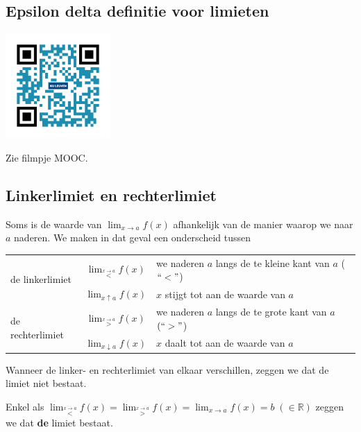 \subsection{Epsilon delta definitie voor limieten}
\begin{minipage}{.25\linewidth}
	\raggedright
	\includegraphics[width=4cm]{2_elem_rekenvaardigheden_B/inputs/QR_Code_EPSILONDELTA_module2}
\end{minipage}
\begin{minipage}{.7\linewidth}
	Zie filmpje MOOC.
\end{minipage}

\subsection{Linkerlimiet en rechterlimiet}

Soms is de waarde van $\lim_{x\to a}f(x)$ afhankelijk
van de manier waarop we naar $a$ naderen. We maken in dat geval een
onderscheid tussen

\begin{table}[h]
\centering
\begin{tabular}{lcl}
	\multirow{2}{*}{de linkerlimiet} & $\lim_{\overset{x\rightarrow a}{<}}f(x)$ & we naderen $a$ langs de te kleine kant van $a$ ($\lyxmathsym{\textquotedblleft}<\lyxmathsym{\textquotedblright}$)\\
	& $\lim_{x\uparrow a}f(x)$ & $x$ stijgt tot aan de waarde van $a$\\
	\multirow{2}{*}{de rechterlimiet} & $\lim_{\overset{x\rightarrow a}{>}}f(x)$ & we naderen $a$ langs de te grote kant van $a$ $(\lyxmathsym{\textquotedblleft}>\lyxmathsym{\textquotedblright}$)\\
	& $\lim_{x\downarrow a}f(x)$ & $x$ daalt tot aan de waarde van $a$\\
\end{tabular}
\end{table}

Wanneer de linker- en rechterlimiet van elkaar verschillen,
zeggen we dat de limiet niet bestaat. 

Enkel als $\lim_{\overset{x\rightarrow a}{<}}f(x)=\lim_{\overset{x\rightarrow a}{>}}f(x)=\lim_{x\to a}f(x)=b\;(\in\mathbb{R})$
zeggen we dat \textbf{de} limiet bestaat.

